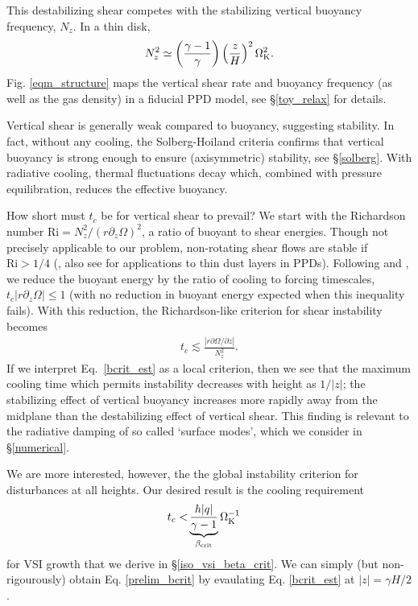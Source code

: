 \documentclass[iop, numberedappendix]{emulateapj}
\newcommand{\p}{\partial}
\def \OmK {\Omega_{\rm K}}
\begin{document}
This destabilizing shear competes with the stabilizing vertical
buoyancy frequency, $N_z$.  In a thin disk,     
\begin{align}\label{nz_thin}
  N_z^2 \simeq \left(\frac{\gamma-1}{\gamma}\right) \left(\frac{z}{H}\right)^2
  \OmK^2.  
\end{align}
Fig. \ref{eqm_structure} maps the vertical shear rate and buoyancy
frequency (as well as the gas density) 
in a fiducial PPD model, see \S\ref{toy_relax} for details. 

Vertical shear is 
generally weak compared to buoyancy, suggesting stability. In fact, 
without any cooling, the Solberg-Hoiland criteria %
confirms that vertical buoyancy is strong
enough to ensure (axisymmetric) stability, see \S\ref{solberg}.  With radiative cooling, 
thermal fluctuations decay which, combined with pressure equilibration, reduces the effective buoyancy.

How short must $t_c$ be for vertical shear to prevail?  We start with 
 the Richardson number $\mathrm{Ri} = N_z^2/(r\p_z\Omega)^2$, a 
ratio of buoyant to shear energies.  Though not precisely applicable to our problem,
non-rotating shear flows are stable if $\mathrm{Ri} > 1/4$ (\citealp{chandrasekhar61}, 
also see \citealp{ys02, lee10} for applications to thin dust layers in PPDs).
Following \cite{urpin03} and \cite{townsend58},  we reduce the buoyant energy by the 
ratio of cooling to forcing timescales, $t_c |r \p_z\Omega| \leq 1$ (with no reduction in buoyant energy 
expected when this inequality fails).  With this reduction, the Richardson-like criterion for 
shear instability becomes  \citep{urpin03}
\begin{align}\label{bcrit_est}
  t_c \lesssim \frac{\left|r\p\Omega/\p z\right|} {N_z^2}.
\end{align}
If we interpret Eq.\ \ref{bcrit_est} as a local criterion, then we see that 
the maximum cooling time which permits instability decreases with height as $1/|z|$;  
the stabilizing effect of vertical buoyancy increases more rapidly away from
the midplane than the destabilizing effect of vertical shear.  
This finding is relevant to the radiative damping of so called `surface 
modes', which we consider in \S\ref{numerical}.

We are more interested, however, the the global instability criterion for disturbances at all heights.
Our desired result 
is the cooling requirement 
\begin{align}\label{prelim_bcrit}
  t_c <  &\underbrace{\frac{h |q| }{\gamma - 1}}_{\beta_\mathrm{crit}}\OmK^{-1}
\end{align}   
for VSI growth that we derive in \S\ref{iso_vsi_beta_crit}.  We can simply 
(but non-rigourously) obtain Eq. \ref{prelim_bcrit}
  by evaulating  Eq. \ref{bcrit_est} at $|z|=\gamma H/2$. 
 
\end{document}
